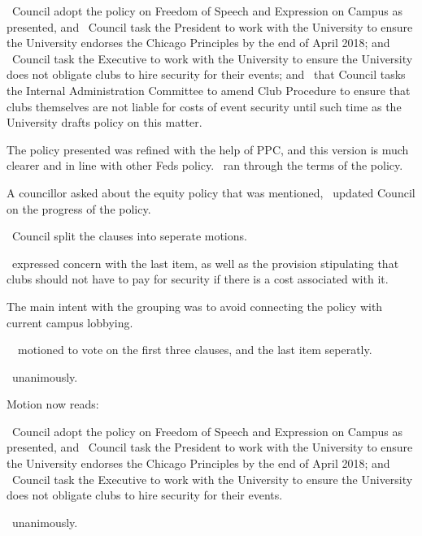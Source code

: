 \begin{motion}
    \birt\ Council adopt the policy on Freedom of Speech and Expression on
    Campus as presented, and 
    \bifrt\ Council task the President to work with the University to ensure
    the University endorses the Chicago Principles by the end of April 2018;
    and 
    \bifrt\ Council task the Executive to work with the University to ensure
    the University does not obligate clubs to hire security for their events;
    and 
    \bifrt\ that Council tasks the Internal Administration Committee to amend
    Club Procedure to ensure that clubs themselves are not liable for costs of
    event security until such time as the University drafts policy on this
    matter.  
    \movers{\alexander}{\seneca}

    The policy presented was refined with the help of PPC, and this version is 
    much clearer and in line with other Feds policy. \alexander\ ran through 
    the terms of the policy.  

    A councillor asked about the equity policy that was mentioned, \antonio\ 
    updated Council on the progress of the policy. 

    \begin{motion}
        \birt\ Council split the clauses into seperate motions. 
        \movers{\jason}{\andrewc}

        \jason\ expressed concern with the last item, as well as the provision
        stipulating that clubs should not have to pay for security if there is
        a cost associated with it. 

        The main intent with the grouping was to avoid connecting the policy
        with current campus lobbying. 

        \andrewc\, \jason\ motioned to vote on the first three clauses, and the
        last item seperatly. 

        \carries\ unanimously.
    \end{motion}

    Motion now reads:
    \begin{motion}
        \birt\ Council adopt the policy on Freedom of Speech and Expression on
        Campus as presented, and
        \bifrt\ Council task the President to work with the University to
        ensure the University endorses the Chicago Principles by the end of
        April 2018; and
        \bifrt\ Council task the Executive to work with the University to
        ensure the University does not obligate clubs to hire security for
        their events.
    \end{motion}

    \carries\ unanimously.
\end{motion}

